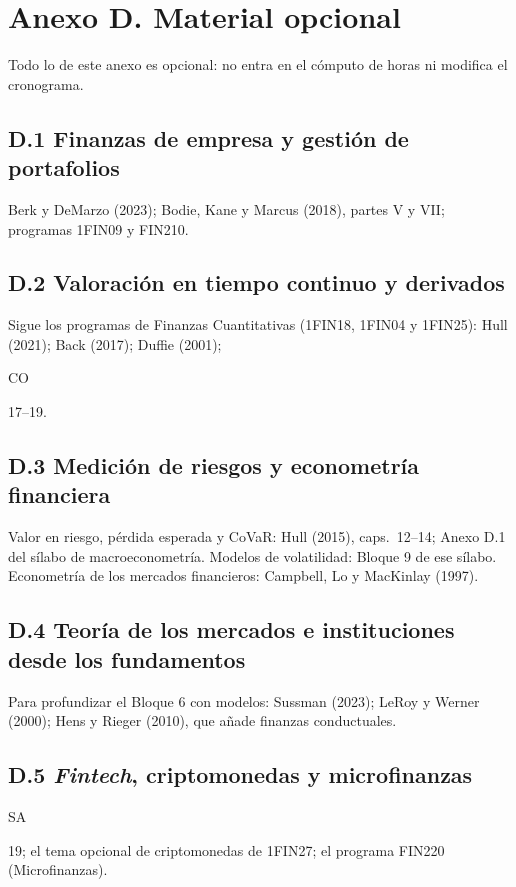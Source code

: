\documentclass[11pt,a4paper]{article}
\newcommand{\etiqueta}[2]{%
  {\setlength{\fboxsep}{1.4pt}\colorbox{#1}{\sffamily\bfseries\color{white}\strut#2}}}
\newcommand{\SA}[1]{\etiqueta{colorSA}{SA}\nobreak\hspace{0.25em}\textcolor{colorSA}{#1}}
\newcommand{\CO}[1]{\etiqueta{colorCO}{CO}\nobreak\hspace{0.25em}\textcolor{colorCO}{#1}}
\begin{document}
\section*{Anexo D. Material opcional}

Todo lo de este anexo es opcional: no entra en el cómputo de horas ni modifica
el cronograma.

\subsection*{D.1 Finanzas de empresa y gestión de portafolios}
Berk y DeMarzo (2023); Bodie, Kane y Marcus (2018), partes V y VII; programas
1FIN09 y FIN210.

\subsection*{D.2 Valoración en tiempo continuo y derivados}
Sigue los programas de Finanzas Cuantitativas (1FIN18, 1FIN04 y 1FIN25): Hull
(2021); Back (2017); Duffie (2001); \CO{17--19}.

\subsection*{D.3 Medición de riesgos y econometría financiera}
Valor en riesgo, pérdida esperada y CoVaR: Hull (2015), caps.~12--14; Anexo D.1
del sílabo de macroeconometría. Modelos de volatilidad: Bloque 9 de ese
sílabo. Econometría de los mercados financieros: Campbell, Lo y MacKinlay
(1997).

\subsection*{D.4 Teoría de los mercados e instituciones desde los fundamentos}
Para profundizar el Bloque 6 con modelos: Sussman (2023); LeRoy y Werner
(2000); Hens y Rieger (2010), que añade finanzas conductuales.

\subsection*{D.5 \emph{Fintech}, criptomonedas y microfinanzas}
\SA{19}; el tema opcional de criptomonedas de 1FIN27; el programa FIN220
(Microfinanzas).
\end{document}
